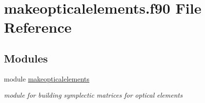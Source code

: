 \hypertarget{makeopticalelements_8f90}{}\section{makeopticalelements.\+f90 File Reference}
\label{makeopticalelements_8f90}
\subsection*{Modules}
\begin{DoxyCompactItemize}
\item 
module \hyperlink{namespacemakeopticalelements}{makeopticalelements}
\begin{DoxyCompactList}\small\item\em module for building symplectic matrices for optical elements \end{DoxyCompactList}\end{DoxyCompactItemize}
